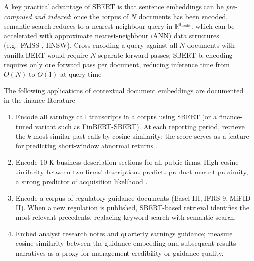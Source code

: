\begin{deepdive}
A key practical advantage of SBERT is that sentence embeddings can be
\emph{pre-computed and indexed}: once the corpus of $N$ documents has
been encoded, semantic search reduces to a nearest-neighbour query in
$\mathbb{R}^{d_{\text{model}}}$, which can be accelerated with
approximate nearest-neighbour (ANN) data structures (e.g.\ FAISS
\cite{johnson2019billion}, %
HNSW).  Cross-encoding a query against all $N$ documents with vanilla
BERT would require $N$ separate forward passes; SBERT bi-encoding
requires only one forward pass per document, reducing inference time
from $O(N)$ to $O(1)$ at query time.


\begin{example}
\label{ex:doc-similarity-finance}
The following applications of contextual document embeddings are
documented in the finance literature:
\begin{enumerate}
  \item Encode all earnings call transcripts in a corpus using SBERT
        (or a finance-tuned variant such as FinBERT-SBERT).  At each
        reporting period, retrieve the $k$ most similar past calls by
        cosine similarity; the score serves as a feature for predicting
        short-window abnormal returns \cite{ko2020}. %
  \item Encode 10-K business description sections for all public firms.
        High cosine similarity between two firms' descriptions predicts
        product-market proximity, a strong predictor of acquisition
        likelihood \cite{frattaroli2019}. %
  \item Encode a corpus of regulatory guidance documents (Basel III,
        IFRS 9, MiFID II).  When a new regulation is published,
        SBERT-based retrieval identifies the most relevant precedents,
        replacing keyword search with semantic search.
  \item Embed analyst research notes and quarterly earnings guidance;
        measure cosine similarity between the guidance embedding and
        subsequent results narratives as a proxy for management
        credibility or guidance quality.
\end{enumerate}
\end{example}


\end{deepdive}
